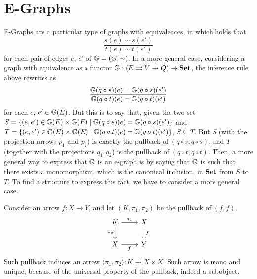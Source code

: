 \section{E-Graphs}\label{sect:eggs}


E-Graphs are a particular type of graphs with equivalences, in which holds that
$$
    \frac{s(e) \sim s(e')}{t(e) \sim t(e')}
$$
for each pair of edges $e$, $e'$ of $\mathbb{G} = (G, \sim)$.
In a more general case, considering a graph with equivalence as a functor $\mathbb{G} : (E \rightrightarrows V \rightarrow Q) \rightarrow \mathbf{Set}$, the inference rule above rewrites as
\[
    \frac{\mathbb{G}(q \circ s)(e) = \mathbb{G}(q \circ s)(e')}{\mathbb{G}(q \circ t)(e) = \mathbb{G}(q \circ t)(e')}
\] for each $e$, $e' \in \mathbb{G}(E)$.
But this is to say that, given the two set $S = \{ (e, e') \in \mathbb{G}(E) \times \mathbb{G}(E) \mid \mathbb{G}(q \circ s)(e) = \mathbb{G}(q \circ s)(e') \}$ and $T =\{ (e, e') \in \mathbb{G}(E) \times \mathbb{G}(E) \mid \mathbb{G}(q \circ t)(e) = \mathbb{G}(q \circ t)(e') \} $, $S \subseteq T$. But $S$ (with the projection arrows $p_1$ and $p_2$) is exactly the pullback of $(q \circ s, q \circ s)$, and $T$ (together with the projections $q_1, q_2$) is the pullback of $(q \circ t, q \circ t)$. Then, a more general way to express that $\mathbb{G}$ is an e-graph is by saying that $\mathbb{G}$ is such that there exists a monomorphism, which is the canonical inclusion, in $\mathbf{Set}$ from $S$ to $T$.
To find a structure to express this fact, we have to consider a more general case.

Consider an arrow $f: X \rightarrow Y$, and let $(K, \pi_1, \pi_2)$ be the pullback of $(f, f)$.
\[
    \begin{tikzcd}
        K \arrow[r, "{\pi_1}"] \arrow[d, "{\pi_2}"swap] & X \arrow[d, "f"] \\
        X \arrow[r, "f"swap] & Y
    \end{tikzcd}
\]
Such pullback induces an arrow $\langle \pi_1, \pi_2 \rangle : K \rightarrow X\times X$. Such arrow is mono and unique, because of the universal property of the pullback, indeed a subobject.

